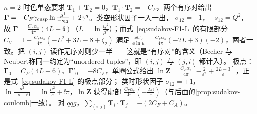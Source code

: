 \begin{example}[两部分子情形与色守恒]\label{ex:sudakov-dipole-twoparton}
$n=2$ 时色单态要求 $\mathbf T_1+\mathbf T_2=0$，$\mathbf T_1\cdot\mathbf T_2=-C_F$，两个有序对给出 $\boldsymbol\Gamma=-C_F\gamma_{\rm cusp}\ln\frac{\mu^2}{-s_{12}}+2\gamma^q$。类空形状因子一入一出，
$\sigma_{12}=-1$，$-s_{12}=Q^2$，故 $\boldsymbol\Gamma=\frac{C_F\alpha_s}{4\pi}(4L-6)$（$L=\ln\frac{Q^2}{\mu^2}$）；而式~\eqref{eq:sudakov-F1-L} 的有限部分 $C_V=1+\frac{C_F\alpha_s}{4\pi}(-L^2+3L-8+\zeta_2)$
满足 $\frac{\dd C_V}{\dd\ln\mu}=\frac{C_F\alpha_s}{4\pi}(-2L+3)(-2)$，两者一致。把 $(i,j)$ 读作无序对则少一半——这就是“有序对”的含义（Becher 与 Neubert\cite{Becher:2009qa}称同一约定为“unordered tuples”，即 $(i,j)$ 与 $(j,i)$ 都计入）。%
极点：$\boldsymbol\Gamma_0=C_F(4L-6)$、$\boldsymbol\Gamma'_0=-8C_F$，单圈公式给出 $\ln\mathbf Z=\frac{C_F\alpha_s}{4\pi}[-\frac2{\varepsilon^2}+\frac{2L-3}\varepsilon]$，正是式~\eqref{eq:sudakov-F1-L} 的极点部分；
类时形状因子 $\sigma_{12}=+1$，$\ln\frac{\mu^2}{-s-\ii0}=\ln\frac{\mu^2}{s}+\ii\pi$，$\ln\mathbf Z$ 获得虚部 $\frac{C_F\alpha_s}{4\pi}(-\frac{2\pi\ii}\varepsilon)$（与后面的\cref{prop:sudakov-coulomb}一致）。
对 $q\bar qg$，$\sum_{(i,j)}\mathbf T_i\cdot\mathbf T_j=-(2C_F+C_A)$。%
\end{example}

